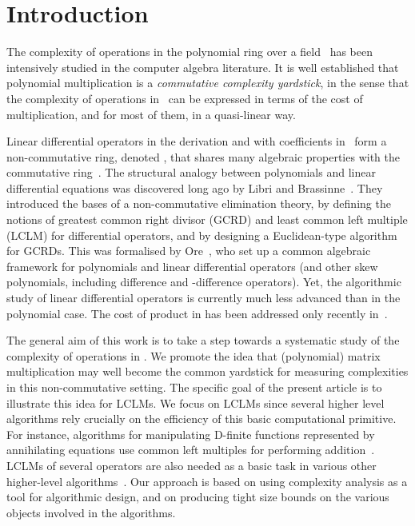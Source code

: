 \documentclass{sig-alt-full}
\begin{document}
\section{Introduction} 
The complexity of operations in the polynomial ring  over a
field~ has been intensively studied in the computer algebra literature.
It is well established that polynomial multiplication is a \emph{commutative
complexity yardstick}, in the sense that the complexity of operations
in~ can be expressed in terms of the cost of multiplication, and for
most of them, in a quasi-linear way.

Linear differential operators in the derivation  and with coefficients in~ form a
non-commutative ring, denoted , that shares many
algebraic properties with the commutative ring~. The structural
analogy between polynomials and linear differential equations was discovered
long ago by Libri and Brassinne~\cite{Libri1833, Brassinne1864, Demidov83}.
They introduced the bases of a non-commutative elimination theory, by defining
the notions of greatest common right divisor (GCRD) and least common left
multiple (LCLM) for differential operators, and by designing a Euclidean-type
algorithm for GCRDs.
This was  formalised by Ore~\cite{Ore32,Ore33}, who set up a common
algebraic framework for polynomials and linear differential operators (and
other skew polynomials, including difference and -difference operators).
Yet, the algorithmic study of linear differential operators is currently much
less advanced than in the polynomial case. The cost of product in
 has been addressed only recently
in~\cite{VdHoeven02,BoChLe08}. 

The general aim of this work is to take a step towards a systematic study of
the complexity of operations in . We promote the
idea that (polynomial) matrix multiplication may well become the common
yardstick for measuring complexities in this non-commutative setting. The
specific goal of the present article is to illustrate this idea
for LCLMs. We focus on LCLMs since several higher level
algorithms rely crucially on the efficiency of this basic computational
primitive. For instance, algorithms for manipulating D-finite functions
represented by annihilating equations use common left multiples for performing
addition~\cite{Stanley80,SaZi94}. 
LCLMs of several operators are also needed as a basic task in various other higher-level algorithms~\cite{BaChLo03,Le03,ClHo04}. 
Our approach is based on using complexity analysis as a tool for algorithmic
design, and on producing tight size bounds on the various objects involved in
the algorithms.
\end{document}
